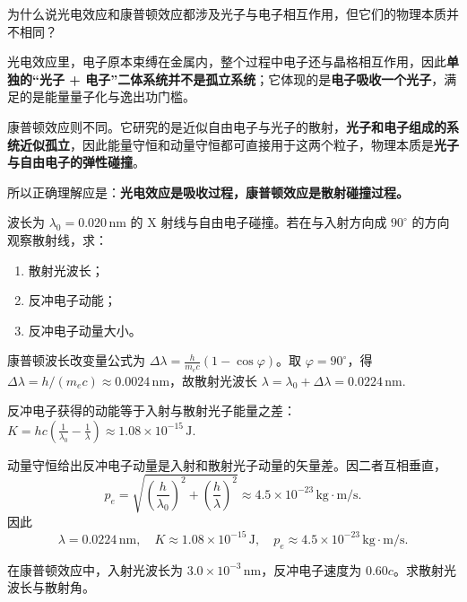 \documentclass[lang=cn,11pt]{elegantbook}
\begin{document}
\begin{exercise}[光电效应与康普顿效应的本质区别]
为什么说光电效应和康普顿效应都涉及光子与电子相互作用，但它们的物理本质并不相同？
\end{exercise}

\begin{solution}
光电效应里，电子原本束缚在金属内，整个过程中电子还与晶格相互作用，因此\textbf{单独的“光子 + 电子”二体系统并不是孤立系统}；它体现的是\textbf{电子吸收一个光子}，满足的是能量量子化与逸出功门槛。

康普顿效应则不同。它研究的是近似自由电子与光子的散射，\textbf{光子和电子组成的系统近似孤立}，因此能量守恒和动量守恒都可直接用于这两个粒子，物理本质是\textbf{光子与自由电子的弹性碰撞}。

所以正确理解应是：\textbf{光电效应是吸收过程，康普顿效应是散射碰撞过程。}
\end{solution}

\begin{exercise}
波长为 \(\lambda_0=0.020\,\mathrm{nm}\) 的 X 射线与自由电子碰撞。若在与入射方向成 \(90^\circ\) 的方向观察散射线，求：
\begin{enumerate}
 \item 散射光波长；
 \item 反冲电子动能；
 \item 反冲电子动量大小。
\end{enumerate}
\end{exercise}

\begin{solution}
康普顿波长改变量公式为 \(\Delta\lambda=\frac{h}{m_ec}(1-\cos\varphi)\)。取 \(\varphi=90^\circ\)，得 \(\Delta\lambda=h/(m_ec)\approx 0.0024\,\mathrm{nm}\)，故散射光波长
 \(\lambda=\lambda_0+\Delta\lambda =0.0224\,\mathrm{nm}.\) 

反冲电子获得的动能等于入射与散射光子能量之差：
 \(K=hc\left(\frac{1}{\lambda_0}-\frac{1}{\lambda}\right) \approx 1.08\times 10^{-15}\,\mathrm{J}.\) 

动量守恒给出反冲电子动量是入射和散射光子动量的矢量差。因二者互相垂直，
\[
p_e=\sqrt{\left(\frac{h}{\lambda_0}\right)^2+\left(\frac{h}{\lambda}\right)^2}
\approx 4.5\times 10^{-23}\,\mathrm{kg\cdot m/s}.
\]
因此
\[
\boxed{
\lambda=0.0224\,\mathrm{nm},\quad
K\approx 1.08\times 10^{-15}\,\mathrm{J},\quad
p_e\approx 4.5\times 10^{-23}\,\mathrm{kg\cdot m/s}.
}
\]
\end{solution}

\begin{exercise}[已知反冲电子速度时反推康普顿散射]
在康普顿效应中，入射光波长为 \(3.0\times 10^{-3}\,\mathrm{nm}\)，反冲电子速度为 \(0.60c\)。求散射光波长与散射角。
\end{exercise}
\end{document}

